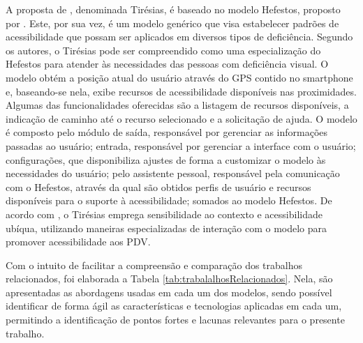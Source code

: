 \documentclass[twoside,english,brazilian]{UNISINOSartigo}
\begin{document}
A proposta de , denominada Tirésias, é baseado no modelo Hefestos, proposto por . Este, por sua vez, é um modelo genérico que visa estabelecer padrões de acessibilidade que possam ser aplicados em diversos tipos de deficiência. Segundo os autores, o Tirésias pode ser compreendido como uma especialização do Hefestos para atender às necessidades das pessoas com deficiência visual. O modelo obtém a posição atual do usuário através do GPS contido no smartphone e, baseando-se nela, exibe recursos de acessibilidade disponíveis nas proximidades. Algumas das funcionalidades oferecidas são a listagem de recursos disponíveis, a indicação de caminho até o recurso selecionado e a solicitação de ajuda. O modelo é composto pelo módulo de saída, responsável por gerenciar as informações passadas ao usuário; entrada, responsável por gerenciar a interface com o usuário; configurações, que disponibiliza ajustes de forma a customizar o modelo às necessidades do usuário; pelo assistente pessoal, responsável pela comunicação com o Hefestos, através da qual são obtidos perfis de usuário e recursos disponíveis para o suporte à acessibilidade; somados ao modelo Hefestos. De acordo com , o Tirésias emprega sensibilidade ao contexto e acessibilidade ubíqua, utilizando maneiras especializadas de interação com o modelo para promover acessibilidade aos PDV.

Com o intuito de facilitar a compreensão e comparação dos trabalhos relacionados, foi elaborada a Tabela \ref{tab:trabalalhosRelacionados}. Nela, são apresentadas as abordagens usadas em cada um dos modelos, sendo possível identificar de forma ágil as características e tecnologias aplicadas em cada um, permitindo a identificação de pontos fortes e lacunas relevantes para o presente trabalho.
\end{document}
